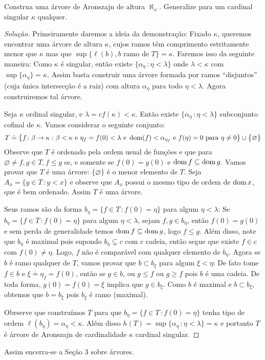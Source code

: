 \documentclass[a4paper]{article}
\begin{document}
 \begin{exercicio}
  Construa uma árvore de Aronszajn de altura \(\aleph_{\omega}\). Generalize
  para um cardinal singular \(\kappa\) qualquer.
\end{exercicio}
\begin{proof}[Solução]
 Primeiramente daremos a ideia da demonstração: Fixado \(\kappa\), queremos
 encontrar uma árvore de altura \(\kappa\), cujos ramos têm comprimento
 estritamente  menor que \(\kappa\) mas que \(\sup \{\ell(b), b\text{ ramo de
 }T\}=\kappa\). Faremos isso da seguinte maneira: Como \(\kappa\) é singular,
 então existe \(\{\alpha_\eta\,\colon\eta<\lambda\}\) onde \(\lambda<\kappa\)
 com \mbox{\(\sup\{\alpha_\eta\}=\kappa\)}. Assim basta construir uma árvore formada
 por  ramos ``disjuntos''  (cuja única intersecção é a raiz) com altura
 \(\alpha_\eta\)  para todo \(\eta<\lambda\). Agora construiremos tal árvore.
 
 Seja \(\kappa\) ordinal singular, e \(\lambda=cf(\kappa)<\kappa\). Então existe
 \(\{\alpha_\eta\,\colon \eta<\lambda\}\) subconjunto cofinal de \(\kappa\).
 Vamos considerar o seguinte
 conjunto: \[T\doteq\big\{f\colon\beta\rightarrow\kappa\,\colon
   \beta<\kappa\text{ e }\eta_f=f(0)<\lambda\text{ e
   }\operatorname{dom}(f)<\alpha_{\eta_f}\text{ e }f(\eta)=0 \text{ para }\eta\neq 0\big\}\cup\big\{\varnothing\big\}\]
 Observe que \(T\) é ordenado pela ordem usual de funções e que para
 \(\varnothing\neq f,g\in T, f\leq g\) se, e somente se  \(f(0)=g(0)\) e
 \(\operatorname{dom} f\subseteq\operatorname{dom} g\).
 Vamos provar que \(T\) é uma árvore:  \(\{\varnothing\}\) é o menor elemento de
 \(T\). Seja \mbox{\(A_x=\{y\in T\,\colon y<x\}\)} e observe que \(A_x\) possui o mesmo
 tipo de ordem de  \(\operatorname{dom} x\), que é bem ordenado. Assim \(T\) é uma árvore. 
 
 Seus ramos são da forma \(b_\eta=\{f\in T\,\colon f(0)=\eta\}\) para algum
 \(\eta<\lambda\): Se \(b_\eta=\{f\in T\,\colon f(0)=\eta\}\) para algum
 \(\eta<\lambda\), sejam \(f,g\in b_\eta\), então \(f(0)=g(0)\) e sem perda de
 generalidade temos \(\operatorname{dom} f\subseteq\operatorname{dom} g\), logo \(f\leq g\). Além disso,
 note que \(b_\eta\) é
 maximal pois supondo \(b_\eta\subsetneq c\) com \(c\) cadeia, então segue que existe
 \(f\in c\) com \(f(0)\neq\eta\). Logo, \(f\) não é comparável com qualquer
 elemento de \(b_\eta\). Agora se \(b\) é ramo qualquer de \(T\), vamos provar
 que \(b\subset b_\xi\) para algum \(\xi<\eta\): De fato tome \(f\in b\) e
 \(\xi\doteq \eta_f=f(0)\), então se \(g\in b\), ou \(g\leq f\) ou \(g\geq f\)
 pois  \(b\) é uma cadeia. De toda forma, \(g(0)=f(0)=\xi\) implica que \( g\in
 b_\xi\). Como \(b\) é maximal e \(b\subset b_\xi\), obtemos que \(b=b_\xi\) pois
 \(b_\xi\) é ramo (maximal). 
 
 Obrserve que construímos \(T\) para que \(b_\eta=\{f\in T\,\colon f(0)=\eta\}\) tenha
 tipo de ordem \(\ell(b_\eta)=\alpha_\eta<\kappa\). Além disso
 \(h(T)=\sup\{\alpha_\eta\,\colon\eta<\lambda\}=\kappa\) e portanto \(T\) é
 árvore de Aronszajn de cardinalidade \(\kappa\) cardinal singular.
 
\end{proof}

Assim encerra-se a Seção 3 sobre árvores.
  
  
\end{document}
